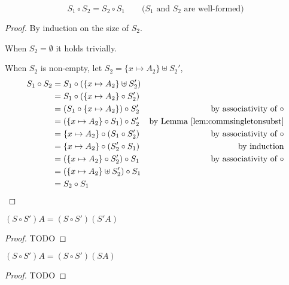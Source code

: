 \begin{theorem}
\[ S_1\circ S_2 = S_2\circ S_1 \qquad\text{($S_1$ and $S_2$ are well-formed)} \]
\end{theorem}
\begin{proof}
By induction on the size of $S_2$.

When $S_2=\emptyset$ it holds trivially.

When $S_2$ is non-empty, let $S_2=\{x\mapsto A_2\}\uplus S_2'$,
\begin{align*}
S_1 \circ S_2
	&= S_1 \circ (\{x\mapsto A_2\}\uplus S_2') \\
	&= S_1 \circ (\{x\mapsto A_2\}\circ S_2') \\
	&= (S_1 \circ \{x\mapsto A_2\}) \circ S_2'
	& \text{by associativity of $\circ$} \\
	&= (\{x\mapsto A_2\}\circ S_1) \circ S_2'
	& \text{by Lemma \ref{lem:commsingletonsubst}} \\
	&= \{x\mapsto A_2\}\circ (S_1 \circ S_2')
	& \text{by associativity of $\circ$} \\
	&= \{x\mapsto A_2\}\circ (S_2' \circ S_1)
	& \text{by induction} \\
	&= (\{x\mapsto A_2\}\circ S_2') \circ S_1
	& \text{by associativity of $\circ$} \\
	&= (\{x\mapsto A_2\}\uplus S_2') \circ S_1 \\
	&= S_2 \circ S_1
\end{align*}
\end{proof}

\begin{lemma} $(S \circ S') A = (S \circ S')(S' A)$
	\label{lem:dupsubstR}
\end{lemma}
\begin{proof}
	TODO
\end{proof}

\begin{lemma} $(S \circ S') A = (S \circ S')(S A)$
	\label{lem:dupsubstL}
\end{lemma}
\begin{proof}
	TODO
\end{proof}


